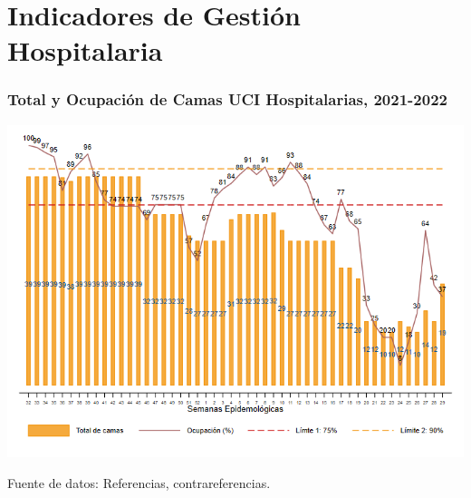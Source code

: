 \documentclass[xcolor=table]{beamer}
\begin{document}
	\section{Indicadores de Gestión Hospitalaria}
	
	\begin{frame}[label=camas]
		\frametitle{Total y Ocupación de Camas UCI Hospitalarias, 2021-2022}
		\vspace{-.2cm}
		\begin{center}
			\includegraphics[width=0.9\linewidth, trim={0cm .5cm 0cm 0.2cm},clip]{../figuras/uci.png}		
		\begin{table}[]
			\vspace{-.5cm}
		\end{table}
		\end{center}
		{\tiny Fuente de datos: Referencias, contrareferencias.}
	\end{frame}
	
\end{document}
